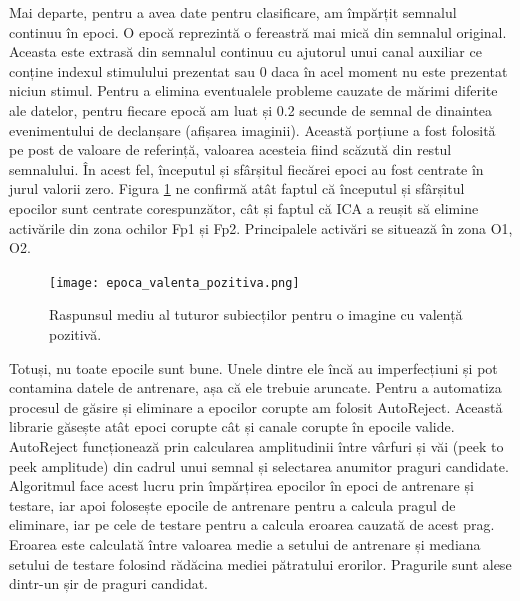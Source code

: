 Mai departe, pentru a avea date pentru clasificare, am împărțit semnalul continuu în epoci. O epocă reprezintă o fereastră mai mică din semnalul original. Aceasta este extrasă din semnalul continuu cu ajutorul unui canal auxiliar ce conține indexul stimulului prezentat sau 0 daca în acel moment nu este prezentat niciun stimul. Pentru a elimina eventualele probleme cauzate de mărimi diferite ale datelor, pentru fiecare epocă am luat și 0.2 secunde de semnal de dinaintea evenimentului de declanșare (afișarea imaginii). Această porțiune a fost folosită pe post de valoare de referință, valoarea acesteia fiind scăzută din restul semnalului. În acest fel, începutul și sfârșitul fiecărei epoci au fost centrate în jurul valorii zero. Figura \ref{fig:raspuns_mediu} ne confirmă atât faptul că începutul și sfârșitul epocilor sunt centrate corespunzător, cât și faptul că ICA a reușit să elimine activările din zona ochilor Fp1 și Fp2. Principalele activări se situează în zona O1, O2.

\begin{figure}[H]
    \centering
		\vspace{-1em}
    \texttt{[image: epoca\_valenta\_pozitiva.png]}
    \caption{Raspunsul mediu al tuturor subiecților pentru o imagine cu valență pozitivă.}
		\vspace{-1em}
    \label{fig:raspuns_mediu}
\end{figure}

Totuși, nu toate epocile sunt bune. Unele dintre ele încă au imperfecțiuni și pot contamina datele de antrenare, așa că ele trebuie aruncate. Pentru a automatiza procesul de găsire și eliminare a epocilor corupte am folosit AutoReject\cite{AutoReject}. Această librarie găsește atât epoci corupte cât și canale corupte în epocile valide. AutoReject funcționează prin calcularea amplitudinii între vârfuri și văi (peek to peek amplitude) din cadrul unui semnal și selectarea anumitor praguri candidate. Algoritmul face acest lucru prin împărțirea epocilor în epoci de antrenare și testare, iar apoi folosește epocile de antrenare pentru a calcula pragul de eliminare, iar pe cele de testare pentru a calcula eroarea cauzată de acest prag. Eroarea este calculată între valoarea medie a setului de antrenare și mediana setului de testare folosind rădăcina mediei pătratului erorilor. Pragurile sunt alese dintr-un șir de praguri candidat.

